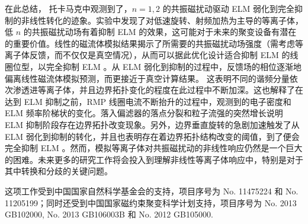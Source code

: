 
在此总结， \east 托卡马克中观测到了，$n=1,2$ 的共振磁扰动驱动 ELM 弱化到完全抑制的非线性转化的迹象。实验中发现了对低速旋转、射频加热为主导的等离子体，低 $n$ 的共振磁扰动场有着抑制 ELM 的效果，这可能对于未来的聚变设备有潜在的重要价值。线性的磁流体模拟结果揭示了所需要的共振磁扰动场强度（需考虑等离子体反馈，而不仅仅是真空情况），从而可以据此优化设计适合抑制 ELM 的线圈位型，以完全抑制 ELM 。从 ELM 弱化到抑制的过程中，反馈场的相位逐渐地偏离线性磁流体模拟预测，而更接近于真空计算结果。
这表明不同的谐频分量依次渗透进等离子体，并且边界拓扑变化的程度在此过程中不断加深。这也解释了在达到 ELM 抑制之前，RMP 线圈电流不断抬升的过程中，观测到的电子密度和 ELM 频率阶梯状的变化。落入偏滤器的落点分裂和粒子流强的突然增长说明 ELM 抑制阶段存在边界拓扑改变现象。另外，边界垂直旋转的急剧加速触发了从 ELM 弱化到抑制的转化，并且也表明存在着边界拓扑结构改变的阈值，到了便会完全抑制 ELM 。然而，模拟等离子体对共振磁扰动的非线性响应仍然是一个巨大的困难。未来更多的研究工作将会投入到理解非线性等离子体响应中，特别是对于其中转换和分歧的关键问题。

这项工作受到中国国家自然科学基金会的支持，项目序号为 No. 11475224 和 No. 11205199；同时还受到中国国家磁约束聚变科学计划支持，项目序号为 No. 2013 GB102000, No. 2013 GB106003B 和 No. 2012 GB105000.

